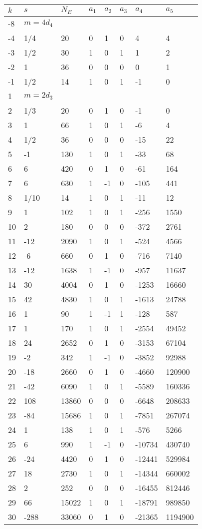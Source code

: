 \documentclass{amsart}
\begin{document}
\begin{longtable}{|l|l|l|lllll|}
\hline
$k$ & $s$ & $N_E$ & $a_1$ & $a_2$ & $a_3$ & $a_4$ & $a_5$\\
\hline
-8&$m=4d_{4}$&&\multicolumn{5}{c|}{}\\
-4&1/4&20&0&1&0&4&4\\
-3&1/2&30&1&0&1&1&2\\
-2&1&36&0&0&0&0&1\\
-1&1/2&14&1&0&1&-1&0\\
1&$m=2d_{3}$&&\multicolumn{5}{c|}{}\\
2&1/3&20&0&1&0&-1&0\\
3&1&66&1&0&1&-6&4\\
4&1/2&36&0&0&0&-15&22\\
5&-1&130&1&0&1&-33&68\\
6&6&420&0&1&0&-61&164\\
7&6&630&1&-1&0&-105&441\\
8&1/10&14&1&0&1&-11&12\\
9&1&102&1&0&1&-256&1550\\
10&2&180&0&0&0&-372&2761\\
11&-12&2090&1&0&1&-524&4566\\
12&-6&660&0&1&0&-716&7140\\
13&-12&1638&1&-1&0&-957&11637\\
14&30&4004&0&1&0&-1253&16660\\
15&42&4830&1&0&1&-1613&24788\\
16&1&90&1&-1&1&-128&587\\
17&1&170&1&0&1&-2554&49452\\
18&24&2652&0&1&0&-3153&67104\\
19&-2&342&1&-1&0&-3852&92988\\
20&-18&2660&0&1&0&-4660&120900\\
21&-42&6090&1&0&1&-5589&160336\\
22&108&13860&0&0&0&-6648&208633\\
23&-84&15686&1&0&1&-7851&267074\\
24&1&138&1&0&1&-576&5266\\
25&6&990&1&-1&0&-10734&430740\\
26&-24&4420&0&1&0&-12441&529984\\
27&18&2730&1&0&1&-14344&660002\\
28&2&252&0&0&0&-16455&812446\\
29&66&15022&1&0&1&-18791&989850\\
30&-288&33060&0&1&0&-21365&1194900\\

\end{longtable}
\end{document}
